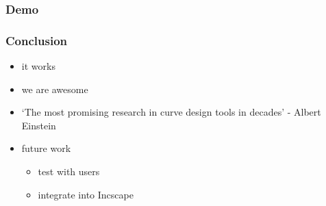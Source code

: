 \documentclass{beamer}
\begin{document}
		\begin{frame}
			\frametitle{Demo}
		\end{frame}
		
		\begin{frame}
			\frametitle{Conclusion}
			\begin{itemize}
				\item it works
				\item we are awesome
				\item `The most promising research in curve design tools in decades' - Albert Einstein
				\item future work
				\begin{itemize}
					\item test with users
					\item integrate into Incscape
				\end{itemize}
			\end{itemize}
		\end{frame}
\end{document}
